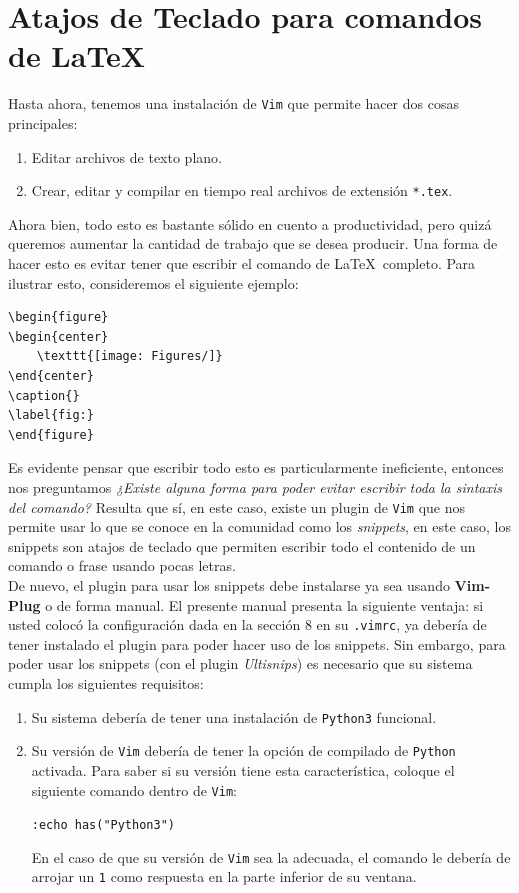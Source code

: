 \documentclass[10pt]{article}
\begin{document}
\section{Atajos de Teclado para comandos de \LaTeX}
Hasta ahora, tenemos una instalación de \texttt{Vim} que permite hacer dos cosas principales:
\begin{enumerate}
	\item Editar archivos de texto plano. 
	\item Crear, editar y compilar en tiempo real archivos de extensión \texttt{*.tex}. 
\end{enumerate}
Ahora bien, todo esto es bastante sólido en cuento a productividad, pero quizá queremos aumentar la cantidad de trabajo que se desea producir. Una forma de hacer esto es evitar tener que escribir el comando de \LaTeX \ completo. Para ilustrar esto, consideremos el siguiente ejemplo:
\begin{verbatim}
\begin{figure}
\begin{center}
	\texttt{[image: Figures/]}
\end{center}
\caption{}
\label{fig:}
\end{figure}
\end{verbatim}
Es evidente pensar que escribir todo esto es particularmente ineficiente, entonces nos preguntamos \textit{¿Existe alguna forma para poder evitar escribir toda la sintaxis del comando?} Resulta que sí, en este caso, existe un plugin de \texttt{Vim} que nos permite usar lo que se conoce en la comunidad como los \textit{snippets}, en este caso, los snippets son atajos de teclado que permiten escribir todo el contenido de un comando o frase usando pocas letras.\\
De nuevo, el plugin para usar los snippets debe instalarse ya sea usando \textbf{Vim-Plug} o de forma manual. El presente manual presenta la siguiente ventaja: si usted colocó la configuración dada en la sección 8 en su \texttt{.vimrc}, ya debería de tener instalado el plugin para poder hacer uso de los snippets. 
Sin embargo, para poder usar los snippets (con el plugin \textit{Ultisnips}) es necesario que su sistema cumpla los siguientes requisitos:
\begin{enumerate}
	\item Su sistema debería de tener una instalación de \texttt{Python3} funcional. 
	\item Su versión de \texttt{Vim} debería de tener la opción de compilado de \texttt{Python} activada. Para saber si su versión tiene esta característica, coloque el siguiente comando dentro de \texttt{Vim}:
	\begin{center}
		\texttt{:echo has("Python3")}
	\end{center}
En el caso de que su versión de \texttt{Vim} sea la adecuada, el comando le debería de arrojar un \texttt{1} como respuesta en la parte inferior de su ventana. 
\end{enumerate}
\end{document}
